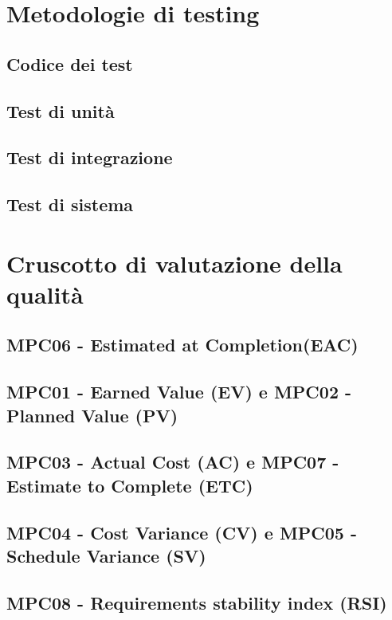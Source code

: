 \documentclass[italian,12pt]{article} %
\begin{document}
\section{Metodologie di testing}

\subsection{Codice dei test}

\subsection{Test di unità}

\subsection{Test di integrazione}

\subsection{Test di sistema}

\newpage

\section{Cruscotto di valutazione della qualità}

\subsection{MPC06 - Estimated at Completion(EAC)}

\subsection{MPC01 - Earned Value (EV) e MPC02 - Planned Value (PV)}

\subsection{MPC03 - Actual Cost (AC) e MPC07 - Estimate to Complete (ETC)}

\subsection{MPC04 - Cost Variance (CV) e MPC05 - Schedule Variance (SV)}

\subsection{MPC08 - Requirements stability index (RSI)}
\end{document}
